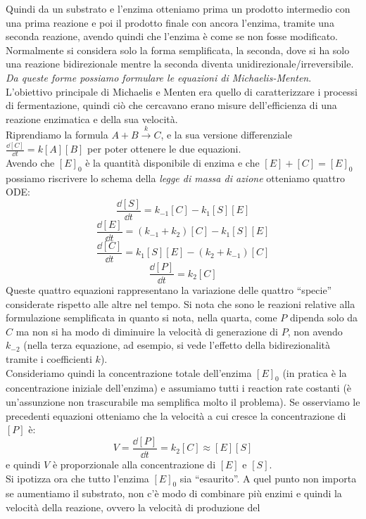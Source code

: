 \documentclass[a4paper,12pt, oneside]{book}
\begin{document}
Quindi da un substrato e l'enzima otteniamo prima un prodotto intermedio con una
prima reazione e poi il prodotto finale con ancora l'enzima, tramite una seconda
reazione, avendo quindi che l'enzima è come se non fosse modificato.\\
Normalmente si considera solo la forma semplificata, la seconda, dove si ha solo
una reazione bidirezionale mentre la seconda diventa
unidirezionale/irreversibile. \\
\textit{Da queste forme possiamo formulare le equazioni di Michaelis-Menten}.\\
L'obiettivo principale di Michaelis e Menten era quello di caratterizzare i
processi di fermentazione, quindi ciò che cercavano erano misure dell'efficienza
di una reazione enzimatica e della sua velocità.  \\
Riprendiamo la formula $A+B\stackrel{k}{\to}C$, e la sua versione
differenziale $\frac{\dd{[C]}}{\dd{t}}=k[A][B]$ per poter ottenere le due
equazioni.\\
Avendo che $[E]_0$ è la quantità disponibile di enzima e che $[E]+[C]=[E]_0$
possiamo riscrivere lo schema della \textit{legge di massa di azione} otteniamo
quattro ODE:
\[\frac{\dd{[S]}}{\dd{t}}=k_{-1}[C]-k_1[S][E]\]
\[\frac{\dd{[E]}}{\dd{t}}=(k_{-1}+k_2)[C]-k_1[S][E]\]
\[\frac{\dd{[C]}}{\dd{t}}=k_1[S][E]-(k_2+k_{-1})[C]\]
\[\frac{\dd{[P]}}{\dd{t}}=k_2[C]\]
Queste quattro equazioni rappresentano la variazione delle quattro ``specie''
considerate rispetto alle altre nel tempo. Si nota che sono le reazioni relative
alla formulazione semplificata in quanto si nota, nella quarta, come $P$ dipenda
solo da $C$ ma non si ha modo di diminuire la velocità di generazione di $P$,
non avendo $k_{-2}$ (nella terza equazione, ad esempio, si vede l'effetto della
bidirezionalità tramite i coefficienti $k$). \\
Consideriamo quindi la concentrazione totale dell'enzima $[E]_0$ (in pratica è
la concentrazione iniziale dell'enzima)
e assumiamo tutti i reaction rate costanti (è un'assunzione non
trascurabile ma semplifica molto il problema). Se osserviamo le precedenti 
equazioni otteniamo che la velocità a cui cresce la concentrazione di $[P]$ è:
\[V=\frac{\dd{[P]}}{\dd{t}}=k_2[C]\approx [E][S]\]
e quindi $V$ è proporzionale alla concentrazione di $[E]$ e $[S]$.\\
Si ipotizza ora che tutto l'enzima $[E]_0$ sia ``esaurito''. A quel punto non
importa se aumentiamo il substrato, non c'è modo di combinare più enzimi e
quindi la velocità della reazione, ovvero la velocità di produzione del
\end{document}
